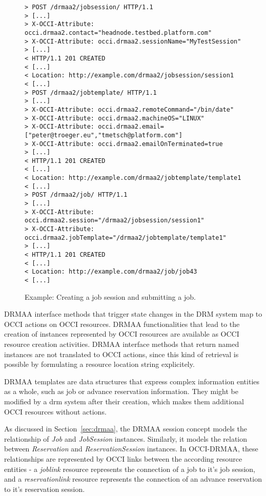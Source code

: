 \documentclass[twocolumn]{svjour3}       %
\begin{document}
\begin{figure*}
\center
\begin{lstlisting}
> POST /drmaa2/jobsession/ HTTP/1.1
> [...]
> X-OCCI-Attribute: occi.drmaa2.contact="headnode.testbed.platform.com"
> X-OCCI-Attribute: occi.drmaa2.sessionName="MyTestSession"
> [...]
< HTTP/1.1 201 CREATED 
< [...] 
< Location: http://example.com/drmaa2/jobsession/session1
< [...]
> POST /drmaa2/jobtemplate/ HTTP/1.1
> [...]
> X-OCCI-Attribute: occi.drmaa2.remoteCommand="/bin/date"
> X-OCCI-Attribute: occi.drmaa2.machineOS="LINUX"
> X-OCCI-Attribute: occi.drmaa2.email=["peter@troeger.eu","tmetsch@platform.com"]
> X-OCCI-Attribute: occi.drmaa2.emailOnTerminated=true
> [...]
< HTTP/1.1 201 CREATED 
< [...] 
< Location: http://example.com/drmaa2/jobtemplate/template1
< [...]
> POST /drmaa2/job/ HTTP/1.1
> [...]
> X-OCCI-Attribute: occi.drmaa2.session="/drmaa2/jobsession/session1"
> X-OCCI-Attribute: occi.drmaa2.jobTemplate="/drmaa2/jobtemplate/template1"
> [...]
< HTTP/1.1 201 CREATED 
< [...] 
< Location: http://example.com/drmaa2/job/job43
< [...]
\end{lstlisting}
\caption{Example: Creating a job session and submitting a job.}
\label{fig:createjob} 
\end{figure*}

DRMAA interface methods that trigger state changes in the DRM system map to OCCI actions on OCCI resources. DRMAA functionalities that lead to the creation of instances represented by OCCI resources are available as OCCI resource creation activities. DRMAA interface methods that return named instances are not translated to OCCI actions, since this kind of retrieval is possible by formulating a resource location string explicitely. 

DRMAA templates are data structures that express complex information entities as a whole, such as job or advance reservation information. They might be modified by a \gls{drm} system after their creation, which makes them additional OCCI resources without actions.

As discussed in Section~\ref{sec:drmaa}, the DRMAA session concept models the relationship of \emph{Job} and \emph{JobSession} instances. Similarly, it models the relation between \emph{Reservation} and \emph{ReservationSession} instances. In OCCI-DRMAA, these relationships are represented by OCCI links between the according resource entities -  a \emph{joblink} resource represents the connection of a job to it's job session, and a \emph{reservationlink} resource represents the connection of an advance reservation to it's reservation session.
\end{document}
